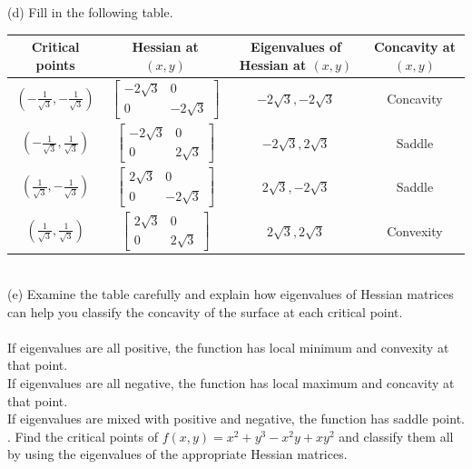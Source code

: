 \documentclass{article} %
\begin{document}
{    \noindent (d) Fill in the following table. \\
    \begin{tabular}{|c|c|c|c|}
        \hline
        Critical points & Hessian at $ (x, y) $ & Eigenvalues of Hessian at $ (x, y) $ & Concavity at $ (x, y) $ \\
        \hline
        $ \left(-\frac{1}{\sqrt{3}}, -\frac{1}{\sqrt{3}}\right) $ & $\begin{bmatrix} -2\sqrt{3} & 0 \\ 0 & -2\sqrt{3} \end{bmatrix}$ & $-2\sqrt{3}, -2\sqrt{3}$ & Concavity \\
        \hline
        $ \left(-\frac{1}{\sqrt{3}}, \frac{1}{\sqrt{3}}\right) $ & $\begin{bmatrix} -2\sqrt{3} & 0 \\ 0 & 2\sqrt{3} \end{bmatrix}$ & $-2\sqrt{3}, 2\sqrt{3}$ & Saddle \\
        \hline
        $ \left(\frac{1}{\sqrt{3}}, -\frac{1}{\sqrt{3}}\right) $ & $\begin{bmatrix} 2\sqrt{3} & 0 \\ 0 & -2\sqrt{3} \end{bmatrix}$ & $2\sqrt{3}, -2\sqrt{3}$ & Saddle \\
        \hline
        $ \left(\frac{1}{\sqrt{3}}, \frac{1}{\sqrt{3}}\right) $ & $\begin{bmatrix} 2\sqrt{3} & 0 \\ 0 & 2\sqrt{3} \end{bmatrix}$ & $2\sqrt{3}, 2\sqrt{3}$ & Convexity \\
        \hline
    \end{tabular} \\

    \noindent (e) Examine the table carefully and explain how eigenvalues of Hessian matrices can help you classify
    the concavity of the surface at each critical point.\\ \\
    If eigenvalues are all positive, the function has local minimum and convexity at that point. \\
    If eigenvalues are all negative, the function has local maximum and concavity at that point. \\
    If eigenvalues are mixed with positive and negative, the function has saddle point. \\

    . Find the critical points of $ f(x, y) = x^2 + y^3 - x^2y + xy^2 $ and classify them all by using the eigenvalues
    of the appropriate Hessian matrices.

}
\end{document}
